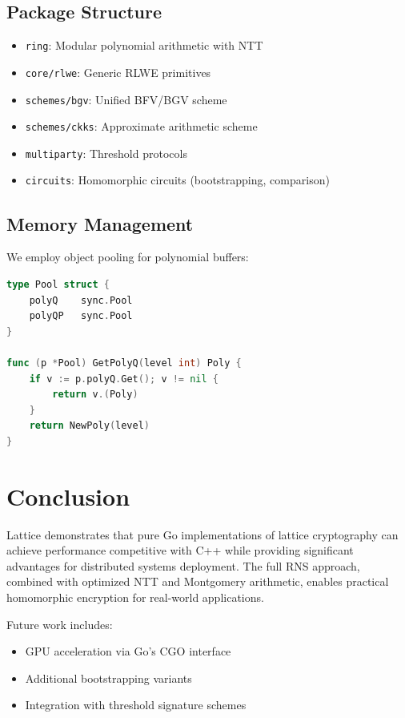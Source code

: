 \documentclass[11pt,a4paper]{article}
\theoremstyle{definition}
\begin{document}
\subsection{Package Structure}

\begin{itemize}
\item \texttt{ring}: Modular polynomial arithmetic with NTT
\item \texttt{core/rlwe}: Generic RLWE primitives
\item \texttt{schemes/bgv}: Unified BFV/BGV scheme
\item \texttt{schemes/ckks}: Approximate arithmetic scheme
\item \texttt{multiparty}: Threshold protocols
\item \texttt{circuits}: Homomorphic circuits (bootstrapping, comparison)
\end{itemize}

\subsection{Memory Management}

We employ object pooling for polynomial buffers:

\begin{lstlisting}[language=Go]
type Pool struct {
    polyQ    sync.Pool
    polyQP   sync.Pool
}

func (p *Pool) GetPolyQ(level int) Poly {
    if v := p.polyQ.Get(); v != nil {
        return v.(Poly)
    }
    return NewPoly(level)
}
\end{lstlisting}

\section{Conclusion}

Lattice demonstrates that pure Go implementations of lattice cryptography can achieve performance competitive with C++ while providing significant advantages for distributed systems deployment. The full RNS approach, combined with optimized NTT and Montgomery arithmetic, enables practical homomorphic encryption for real-world applications.

Future work includes:
\begin{itemize}
\item GPU acceleration via Go's CGO interface
\item Additional bootstrapping variants
\item Integration with threshold signature schemes
\end{itemize}
\end{document}
